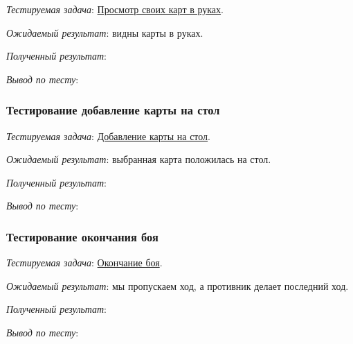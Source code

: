 \documentclass[12pt, a4paper, simple]{eskdtext}
\begin{document}
    \textit{Тестируемая задача}: \underline{Просмотр своих карт в руках}.
    
    \textit{Ожидаемый результат}: видны карты в руках.

    \textit{Полученный результат}:

    \textit{Вывод по тесту}:


    \subsubsection*{Тестирование добавление карты на стол}

    \textit{Тестируемая задача}: \underline{Добавление карты на стол}.
    
    \textit{Ожидаемый результат}: выбранная карта положилась на стол.

    \textit{Полученный результат}:

    \textit{Вывод по тесту}:


    \subsubsection*{Тестирование окончания боя}

    \textit{Тестируемая задача}: \underline{Окончание боя}.
    
    \textit{Ожидаемый результат}: мы пропускаем ход, а противник делает последний ход.
    
    \textit{Полученный результат}:

    \textit{Вывод по тесту}:

    \newpage

    \newpage
\end{document}
